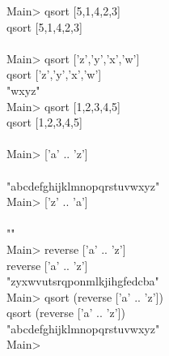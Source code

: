\documentclass[11pt]{article}
\begin{document}
\begin{program*}
\> Main> qsort [5,1,4,2,3]                                       \\
\> qsort [5,1,4,2,3]                                       \\
\> [1,2,3,4,5]                                       \\
\> Main> qsort ['z','y','x','w']                                       \\
\> qsort ['z','y','x','w']                                       \\
\> "wxyz"                                       \\
\> Main> qsort [1,2,3,4,5]                                       \\
\> qsort [1,2,3,4,5]                                       \\
\> [1,2,3,4,5]                                       \\
\> Main> ['a' .. 'z']                                       \\
\> ['a' .. 'z']                                       \\
\> "abcdefghijklmnopqrstuvwxyz"                                       \\
\> Main> ['z' .. 'a']                                       \\
\> ['z' .. 'a']                                       \\
\> ""                                       \\
\> Main> reverse ['a' .. 'z']                                       \\
\> reverse ['a' .. 'z']                                       \\
\> "zyxwvutsrqponmlkjihgfedcba"                                       \\
\> Main> qsort (reverse ['a' .. 'z'])                                       \\
\> qsort (reverse ['a' .. 'z'])                                       \\
\> "abcdefghijklmnopqrstuvwxyz"                                       \\
\> Main>                                        \\

\end{program*}
\end{document}
